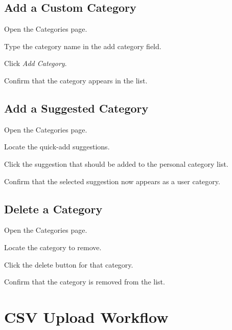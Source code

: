 \subsection{Add a Custom Category}
\begin{normalsteps}
	\item Open the Categories page.
	\item Type the category name in the add category field.
	\item Click \textit{Add Category}.
	\item Confirm that the category appears in the list.
\end{normalsteps}

\subsection{Add a Suggested Category}
\begin{normalsteps}
	\item Open the Categories page.
	\item Locate the quick-add suggestions.
	\item Click the suggestion that should be added to the personal category list.
	\item Confirm that the selected suggestion now appears as a user category.
\end{normalsteps}

\subsection{Delete a Category}
\begin{normalsteps}
	\item Open the Categories page.
	\item Locate the category to remove.
	\item Click the delete button for that category.
	\item Confirm that the category is removed from the list.
\end{normalsteps}

\section{CSV Upload Workflow}
